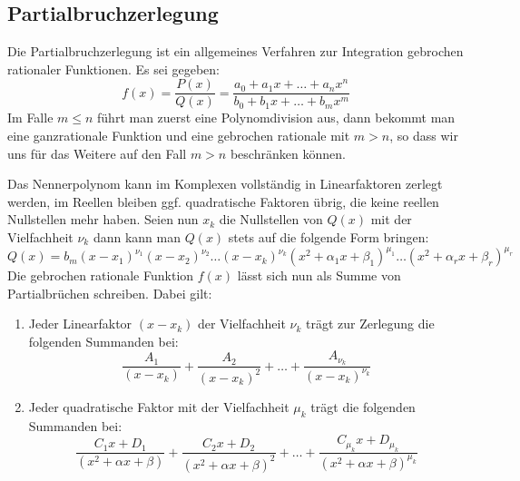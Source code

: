 \subsection{Partialbruchzerlegung}
Die Partialbruchzerlegung ist ein allgemeines Verfahren zur Integration
gebrochen rationaler Funktionen. Es sei gegeben:
\begin{equation}
  \label{eq:68}
  f(x)=\frac{P(x)}{Q(x)}
  =\frac{a_0+a_1x+\dots+a_nx^n}{b_0+b_1x+\dots+b_mx^m}
\end{equation}
Im Falle $m\le n$ führt man zuerst eine Polynomdivision aus, dann bekommt man
eine ganzrationale Funktion und eine gebrochen rationale mit $m>n$, so dass
wir uns für das Weitere auf den Fall $m>n$ beschränken können.

Das Nennerpolynom kann im Komplexen vollständig in Linearfaktoren zerlegt
werden, im Reellen bleiben ggf. quadratische Faktoren übrig, die keine reellen
Nullstellen mehr haben. Seien nun $x_k$ die Nullstellen von $Q(x)$ mit der
Vielfachheit $\nu_k$ dann kann man $Q(x)$ stets auf die folgende Form bringen:
\begin{equation}
  \label{eq:69}
  Q(x)=b_m(x-x_1)^{\nu_1}(x-x_2)^{\nu_2}\dots(x-x_k)^{\nu_k}
  (x^2+\alpha_1x+\beta_1)^{\mu_1}\dots(x^2+\alpha_rx+\beta_r)^{\mu_r}
\end{equation}
Die gebrochen rationale Funktion $f(x)$ lässt sich nun als Summe von
Partialbrüchen schreiben. Dabei gilt:
\begin{enumerate}
\item Jeder Linearfaktor $(x-x_k)$ der Vielfachheit $\nu_k$ trägt zur
  Zerlegung die folgenden Summanden bei:
  \[
  \frac{A_1}{(x-x_k)}+\frac{A_2}{(x-x_k)^2}+\dots
  +\frac{A_{\nu_k}}{(x-x_k)^{\nu_k}}
  \]
\item Jeder quadratische Faktor mit der Vielfachheit $\mu_k$ trägt die
  folgenden Summanden bei:
  \[
  \frac{C_1x+D_1}{(x^2+\alpha x+\beta)}+
  \frac{C_2x+D_2}{(x^2+\alpha x+\beta)^2}+\dots+
  \frac{C_{\mu_k}x+D_{\mu_k}}{(x^2+\alpha x+\beta)^{\mu_k}}
  \]
\end{enumerate}

